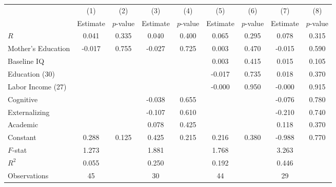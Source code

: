 \begin{tabular}{lcccccccc} \toprule
 & (1) & (2) & (3) & (4) & (5) & (6) & (7) & (8) \\ 
 & Estimate  & $p$-value  & Estimate  & $p$-value  & Estimate  & $p$-value  & Estimate  & $p$-value  \\  \midrule
$R$ &     0.041 &     0.335 &     0.040 &     0.400 &     0.065 &     0.295 &     0.078 &     0.315 \\  
Mother's Education &    -0.017 &     0.755 &    -0.027 &     0.725 &     0.003 &     0.470 &    -0.015 &     0.590 \\  
Baseline IQ &         &         &         &         &     0.003 &     0.415 &     0.015 &     0.105 \\  
Education (30) &         &         &         &         &    -0.017 &     0.735 &     0.018 &     0.370 \\  
Labor Income (27) &         &         &         &         &    -0.000 &     0.950 &    -0.000 &     0.915 \\  
Cognitive &         &         &    -0.038 &     0.655 &         &         &    -0.076 &     0.780 \\  
Externalizing &         &         &    -0.107 &     0.610 &         &         &    -0.210 &     0.740 \\  
Academic &         &         &     0.078 &     0.425 &         &         &     0.118 &     0.370 \\  
Constant &     0.288 &     0.125 &     0.425 &     0.215 &     0.216 &     0.380 &    -0.988 &     0.770 \\  \midrule
$F$-stat &     1.273 &         &     1.881 &         &     1.768 &         &     3.263 &         \\  
$R^2$ &     0.055 &         &     0.250 &         &     0.192 &         &     0.446 &         \\  
Observations &    45 &         &    30 &         &    44 &         &    29 &         \\  
\bottomrule
\end{tabular}

